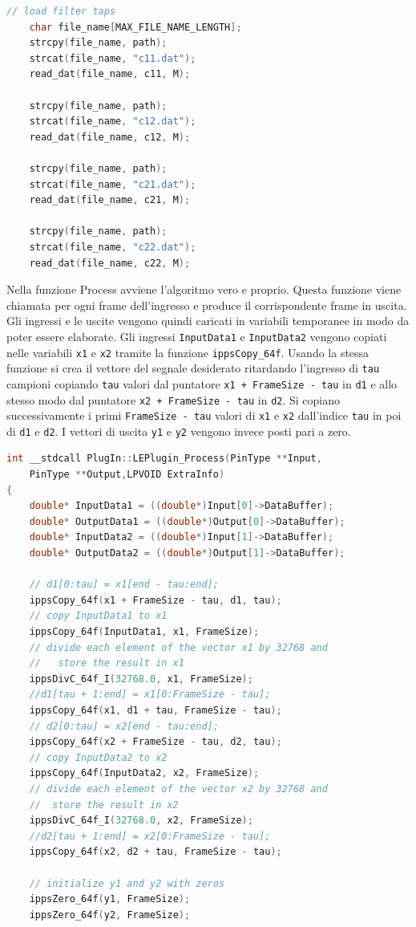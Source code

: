 \documentclass[12pt,a4paper,titlepage]{article}
\begin{document}
\begin{lstlisting}[language=cpp, label=code:hrir, caption = Lettura delle HRIR, breaklines = false, captionpos = b]
	// load filter taps
	char file_name[MAX_FILE_NAME_LENGTH];
	strcpy(file_name, path);
	strcat(file_name, "c11.dat");
	read_dat(file_name, c11, M);

	strcpy(file_name, path);
	strcat(file_name, "c12.dat");
	read_dat(file_name, c12, M);

	strcpy(file_name, path);
	strcat(file_name, "c21.dat");
	read_dat(file_name, c21, M);

	strcpy(file_name, path);
	strcat(file_name, "c22.dat");
	read_dat(file_name, c22, M);
\end{lstlisting}
Nella funzione Process avviene l'algoritmo vero e proprio. Questa funzione viene chiamata per ogni frame dell'ingresso e produce il corrispondente frame in uscita.
Gli ingressi e le uscite vengono quindi caricati in variabili temporanee in modo da poter essere elaborate.
Gli ingressi \texttt{InputData1} e \texttt{InputData2} vengono copiati nelle variabili \texttt{x1} e \texttt{x2} tramite la funzione \texttt{ippsCopy\_64f}.
Usando la stessa funzione si crea il vettore del segnale desiderato ritardando l’ingresso di \texttt{tau} campioni copiando \texttt{tau} valori dal puntatore \texttt{x1 + FrameSize - tau} in \texttt{d1} e  allo stesso modo dal puntatore \texttt{x2 + FrameSize - tau} in \texttt{d2}. Si copiano successivamente i primi \texttt{FrameSize - tau} valori di \texttt{x1} e \texttt{x2} dall'indice \texttt{tau} in poi di \texttt{d1} e \texttt{d2}.
I vettori di uscita \texttt{y1} e \texttt{y2} vengono invece posti pari a zero.
\begin{lstlisting}[language=cpp, label=code:proc, caption = Process, breaklines = false, captionpos = b]
int __stdcall PlugIn::LEPlugin_Process(PinType **Input,
	PinType **Output,LPVOID ExtraInfo)
{ 
	double* InputData1 = ((double*)Input[0]->DataBuffer);
	double* OutputData1 = ((double*)Output[0]->DataBuffer);
	double* InputData2 = ((double*)Input[1]->DataBuffer);
	double* OutputData2 = ((double*)Output[1]->DataBuffer);

	// d1[0:tau] = x1[end - tau:end];
	ippsCopy_64f(x1 + FrameSize - tau, d1, tau);
	// copy InputData1 to x1
	ippsCopy_64f(InputData1, x1, FrameSize);
	// divide each element of the vector x1 by 32768 and
	//	 store the result in x1
	ippsDivC_64f_I(32768.0, x1, FrameSize);
	//d1[tau + 1:end] = x1[0:FrameSize - tau];	
	ippsCopy_64f(x1, d1 + tau, FrameSize - tau);
	// d2[0:tau] = x2[end - tau:end];
	ippsCopy_64f(x2 + FrameSize - tau, d2, tau);
	// copy InputData2 to x2
	ippsCopy_64f(InputData2, x2, FrameSize);
	// divide each element of the vector x2 by 32768 and 
	//	store the result in x2
	ippsDivC_64f_I(32768.0, x2, FrameSize);
	//d2[tau + 1:end] = x2[0:FrameSize - tau];	
	ippsCopy_64f(x2, d2 + tau, FrameSize - tau);
	
	// initialize y1 and y2 with zeros
	ippsZero_64f(y1, FrameSize);
	ippsZero_64f(y2, FrameSize);
\end{lstlisting}
\end{document}
